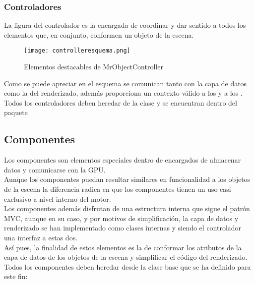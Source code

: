 \subsubsection{Controladores}
La figura del controlador es la encargada de coordinar y dar sentido a todos los elementos que, en conjunto, conformen un objeto de la escena. 

\begin{figure}[h!]
\begin{center}
\texttt{[image: controlleresquema.png]}
\end{center}
\caption[Elementos destacables de MrObjectController]{Elementos destacables de MrObjectController}
\label{fig:controlleresquema}
\end{figure}

Como se puede apreciar en el esquema se comunican tanto con la capa de datos como la del renderizado, además proporciona un contexto válido a los \rorefobject y a los \rorefeventlistener.\\

Todos los controladores deben heredar de la clase \rorefobjectcontroller y se encuentran dentro del paquete \\

\subsection{Componentes}
Los componentes son elementos especiales dentro de \robotto encargados de almacenar datos y comunicarse con la GPU.\\
Aunque los componentes puedan resultar similares en funcionalidad a los objetos de la escena la diferencia radica en que los componentes tienen un uso casi exclusivo a nivel interno del motor.\\
Los componentes además disfrutan de una estructura interna que sigue el patrón MVC, aunque en su caso, y por motivos de simplificación, la capa de datos y renderizado se han implementado como clases internas y siendo el controlador una interfaz a estas dos.\\

Así pues, la finalidad de estos elementos es la de conformar los atributos de la capa de datos de los objetos de la escena y simplificar el código del renderizado.\\

Todos los componentes deben heredar desde la clase base que se ha definido para este fin: \rorefcomponent

